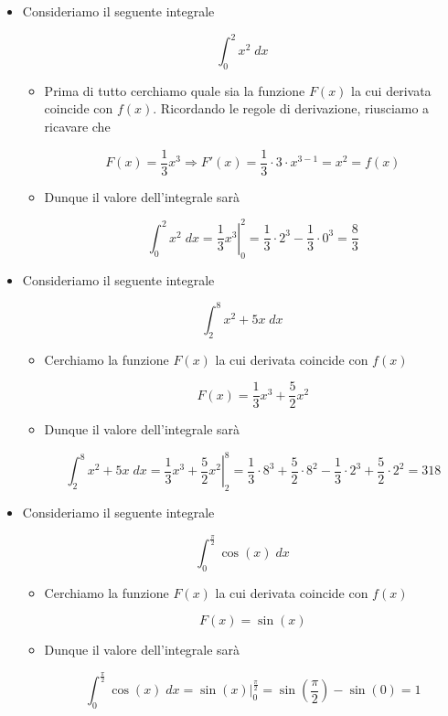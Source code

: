 \documentclass[a4paper, 12pt]{report}
\begin{document}
    \begin{itemize}
        \item Consideriamo il seguente integrale
        
        \[ \int_{0}^{2} x^2 \; dx\]
        
        \begin{itemize}
            \item Prima di tutto cerchiamo quale sia la funzione $F(x)$ la cui derivata coincide con $f(x)$. Ricordando le regole di derivazione, riusciamo a ricavare che
            
            \[ F(x) = \frac{1}{3} x^3 \Longrightarrow F'(x) = \frac{1}{3} \cdot 3 \cdot x^{3-1} = x^2 = f(x)\]
            
            \item Dunque il valore dell'integrale sarà
            
            \[ \int_{0}^{2} x^2 \; dx = \left . \frac{1}{3} x^3 \right |_{0}^{2} = \frac{1}{3} \cdot 2^3 - \frac{1}{3} \cdot 0^3 = \frac{8}{3}\]
        \end{itemize}
        
        \item Consideriamo il seguente integrale
        
        \[ \int_{2}^{8} x^2+5x \; dx\]
        
        \begin{itemize}
            \item Cerchiamo la funzione $F(x)$ la cui derivata coincide con $f(x)$
            
            \[ F(x) = \frac{1}{3}x^3+\frac{5}{2}x^2\]
            
            \item Dunque il valore dell'integrale sarà
            
            \[ \int_{2}^{8} x^2+5x \; dx = \left . \frac{1}{3}x^3+\frac{5}{2}x^2 \right |_{2}^{8} = \frac{1}{3} \cdot 8^3 +\frac{5}{2} \cdot 8^2 -  \frac{1}{3} \cdot 2^3 +\frac{5}{2} \cdot 2^2 = 318\]
        \end{itemize}
        
        \item Consideriamo il seguente integrale
        
        \[ \int_{0}^{\frac{\pi}{2}} \cos(x) \; dx\]
        
        \begin{itemize}
            \item Cerchiamo la funzione $F(x)$ la cui derivata coincide con $f(x)$
            
            \[ F(x) = \sin(x)\]
            
            \item Dunque il valore dell'integrale sarà
            
            \[ \int_{0}^{\frac{\pi}{2}} \cos(x) \; dx = \left . \sin(x) \right |_{0}^{\frac{\pi}{2}} = \sin \left (\frac{\pi}{2} \right ) - \sin(0) = 1\]
        \end{itemize}
    \end{itemize}
    
\end{document}
